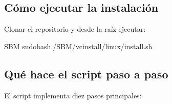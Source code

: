 \documentclass[letterpaper,10pt,english]{sphinxmanual}
\begin{document}
\subsection{Cómo ejecutar la instalación}
\label{\detokenize{vscode:como-ejecutar-la-instalacion}}
\sphinxAtStartPar
Clonar el repositorio y desde la raíz ejecutar:

\begin{sphinxVerbatim}[commandchars=\\\{\}]
SBM
sudobash./SBM/vc\PYGZhy{}install/linux/install.sh
\end{sphinxVerbatim}


\subsection{Qué hace el script paso a paso}
\label{\detokenize{vscode:que-hace-el-script-paso-a-paso}}
\sphinxAtStartPar
El script implementa diez pasos principales:
\end{document}
